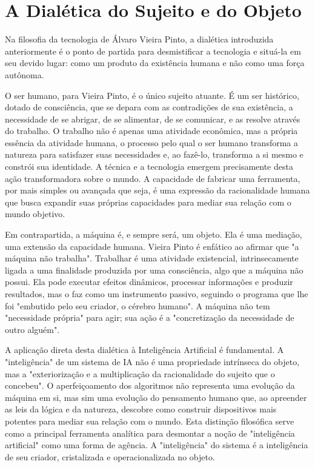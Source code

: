 \section{A Dialética do Sujeito e do Objeto}\label{sec:dialetica}

Na filosofia da tecnologia de Álvaro Vieira Pinto, a dialética introduzida anteriormente é o ponto de partida para desmistificar a tecnologia e situá-la em seu devido lugar: como 
um produto da existência humana e não como uma força autônoma.   

O ser humano, para Vieira Pinto, é o único sujeito atuante. É um ser histórico, dotado de consciência, que se depara com as contradições de sua existência, a necessidade de se 
abrigar, de se alimentar, de se comunicar, e as resolve através do trabalho. O trabalho não é apenas uma atividade econômica, mas a própria essência da atividade humana, o 
processo pelo qual o ser humano transforma a natureza para satisfazer suas necessidades e, ao fazê-lo, transforma a si mesmo e constrói sua identidade. A técnica e a tecnologia 
emergem precisamente desta ação transformadora sobre o mundo. A capacidade de fabricar uma ferramenta, por mais simples ou avançada que seja, é uma expressão da racionalidade 
humana que busca expandir suas próprias capacidades para mediar sua relação com o mundo objetivo.   

Em contrapartida, a máquina é, e sempre será, um objeto. Ela é uma mediação, uma extensão da capacidade humana. Vieira Pinto é enfático ao afirmar que "a máquina não trabalha". 
Trabalhar é uma atividade existencial, intrinsecamente ligada a uma finalidade produzida por uma consciência, algo que a máquina não possui. Ela pode executar efeitos dinâmicos, 
processar informações e produzir resultados, mas o faz como um instrumento passivo, seguindo o programa que lhe foi "embutido pelo seu criador, o cérebro humano". 
A máquina não tem "necessidade própria" para agir; sua ação é a "concretização da necessidade de outro alguém".   

A aplicação direta desta dialética à Inteligência Artificial é fundamental. A "inteligência" de um sistema de IA não é uma propriedade intrínseca do objeto, mas a 
"exteriorização e a multiplicação da racionalidade do sujeito que o concebeu". O aperfeiçoamento dos algoritmos não representa uma evolução da máquina em si, mas sim uma 
evolução do pensamento humano que, ao apreender as leis da lógica e da natureza, descobre como construir dispositivos mais potentes para mediar sua relação com o mundo. 
Esta distinção filosófica serve como a principal ferramenta analítica para desmontar a noção de "inteligência artificial" como uma forma de agência. A "inteligência" do sistema 
é a inteligência de seu criador, cristalizada e operacionalizada no objeto.   

